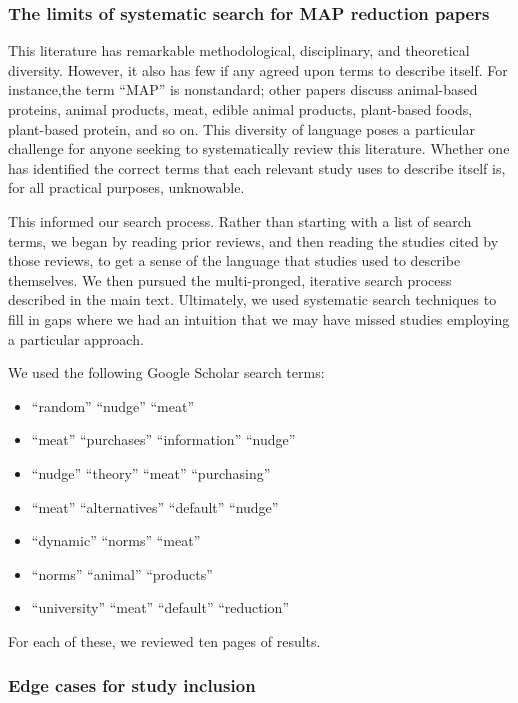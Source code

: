 \documentclass[sn-nature,referee,pdflatex]{sn-jnl}
\providecommand{\tightlist}{%
  \setlength{\itemsep}{0pt}\setlength{\parskip}{0pt}}
\begin{document}
\subsubsection{The limits of systematic search for MAP reduction
papers}\label{sec5.4.1}

This literature has remarkable methodological, disciplinary, and
theoretical diversity. However, it also has few if any agreed upon terms
to describe itself. For instance,the term ``MAP'' is nonstandard; other
papers discuss animal-based proteins, animal products, meat, edible
animal products, plant-based foods, plant-based protein, and so on. This
diversity of language poses a particular challenge for anyone seeking to
systematically review this literature. Whether one has identified the
correct terms that each relevant study uses to describe itself is, for
all practical purposes, unknowable.

This informed our search process. Rather than starting with a list of
search terms, we began by reading prior reviews, and then reading the
studies cited by those reviews, to get a sense of the language that
studies used to describe themselves. We then pursued the multi-pronged,
iterative search process described in the main text. Ultimately, we used
systematic search techniques to fill in gaps where we had an intuition
that we may have missed studies employing a particular approach.

We used the following Google Scholar search terms:

\begin{itemize}
\tightlist
\item
  ``random'' ``nudge'' ``meat''
\item
  ``meat'' ``purchases'' ``information'' ``nudge''
\item
  ``nudge'' ``theory'' ``meat'' ``purchasing''
\item
  ``meat'' ``alternatives'' ``default'' ``nudge''
\item
  ``dynamic'' ``norms'' ``meat''
\item
  ``norms'' ``animal'' ``products''
\item
  ``university'' ``meat'' ``default'' ``reduction''
\end{itemize}

For each of these, we reviewed ten pages of results.

\subsubsection{Edge cases for study inclusion}\label{sec5.4.2}
\end{document}
